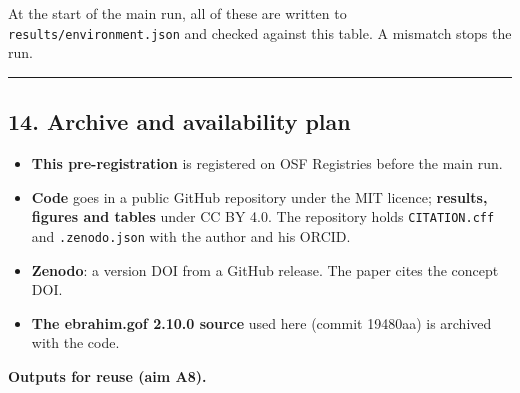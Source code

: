 \documentclass[
  10pt,
]{article}
\providecommand{\tightlist}{%
  \setlength{\itemsep}{0pt}\setlength{\parskip}{0pt}}
\begin{document}
At the start of the main run, all of these are written to
\texttt{results/environment.json} and checked against this
table. A mismatch stops the run.

\begin{center}\rule{0.5\linewidth}{0.5pt}\end{center}

\subsection{14. Archive and availability
plan}\label{archive-and-availability-plan}

\begin{itemize}
\tightlist
\item
  \textbf{This pre-registration} is registered on OSF
  Registries before the main run.
\item
  \textbf{Code} goes in a public GitHub repository under the
  MIT licence; \textbf{results, figures and tables} under CC
  BY 4.0. The repository holds \texttt{CITATION.cff} and
  \texttt{.zenodo.json} with the author and his ORCID.
\item
  \textbf{Zenodo}: a version DOI from a GitHub release. The
  paper cites the concept DOI.
\item
  \textbf{The ebrahim.gof 2.10.0 source} used here (commit
  19480aa) is archived with the code.
\end{itemize}

\textbf{Outputs for reuse (aim A8).}
\end{document}
